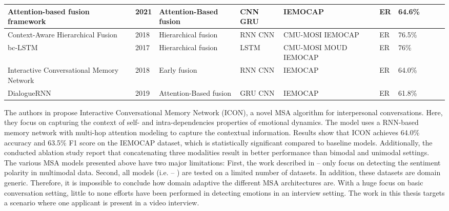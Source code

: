 \begin{table}[h]
{\begin{tabular}{|p{30mm}|l|l|p{20mm}|p{20mm}|l|l|l|l|p{20mm}|}
Attention-based fusion framework \cite{Af-CAN_2021} & 2021 & Attention-Based fusion & CNN \newline GRU & IEMOCAP & ER & 64.6\% \\ \hline
Context-Aware Hierarchical Fusion \cite{DialogueRNN_MAJUMDER2018124} & 2018 & Hierarchical fusion & RNN \newline CNN & CMU-MOSI \newline IEMOCAP & ER &  76.5\% \\ \hline
bc-LSTM \cite{bc-LSTM_poria2017context} & 2017 & Hierarchical fusion & LSTM & CMU-MOSI \newline MOUD \newline IEMOCAP & ER & 76\% \\ \hline
Interactive Conversational Memory Network \cite{ICON_hazarika-etal-2018-icon} & 2018 & Early fusion & RNN \newline CNN & IEMOCAP & ER & 64.0\% \\ \hline
DialogueRNN \cite{DialogueRNN_real} & 2019 & Attention-Based fusion & GRU \newline CNN & IEMOCAP & ER & 61.8\% \\ \hline
\end{tabular}
}
\label{tab:msa_related_work}
\end{table}
%
\newline
\indent The authors in \cite{ICON_hazarika-etal-2018-icon} propose Interactive Conversational Memory Network (ICON), a novel MSA algorithm for interpersonal conversations. Here, they focus on capturing the context of self- and intra-dependencies properties of emotional dynamics. The model uses a RNN-based memory network with multi-hop attention modeling to capture the contextual information. Results show that ICON achieves 64.0\% accuracy and 63.5\% F1 score on the IEMOCAP dataset, which is statistically significant compared to baseline models. Additionally, the conducted ablation study report that concatenating three modalities result in better performance than bimodal and unimodal settings. \\

The various MSA models presented above have two major limitations: First, the work described in \cite{late_fusion_cai2015convolutional} -- \cite{quantum_based_fusion_LI202158} only focus on detecting the sentiment polarity in multimodal data. Second, all models (i.e. \cite{late_fusion_cai2015convolutional} -- \cite{DialogueRNN_real}) are tested on a limited number of datasets. In addition, these datasets are domain generic. Therefore, it is impossible to conclude how domain adaptive the different MSA architectures are. With a huge focus on basic conversation setting, little to none efforts have been performed in detecting emotions in an interview setting. The work in this thesis targets a scenario where one applicant is present in a video interview. 

